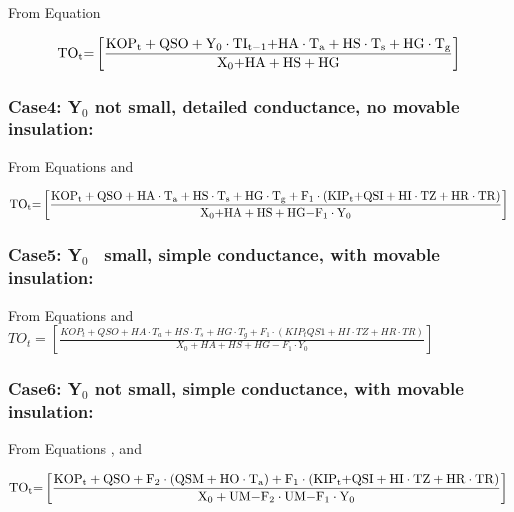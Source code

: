 From Equation

\begin{equation}
{\rm{T}}{{\rm{O}}_{\rm{t}}}{\rm{ = }}\left[ {\frac{{{\rm{KO}}{{\rm{P}}_{\rm{t}}} + {\rm{QSO}} + {{\rm{Y}}_0}\cdot {\rm{T}}{{\rm{I}}_{{\rm{t - 1}}}}{\rm{ + HA}}\cdot {{\rm{T}}_{\rm{a}}} + {\rm{HS}}\cdot {{\rm{T}}_{\rm{s}}} + {\rm{HG}}\cdot {{\rm{T}}_{\rm{g}}}}}{{{{\rm{X}}_{\rm{0}}}{\rm{ + HA + HS + HG}}}}} \right]{\rm{  }}
\end{equation}

\subsubsection{Case4: Y\(_{0}\) not small, detailed conductance, no movable insulation:}\label{case4-yux5f0-not-small-detailed-conductance-no-movable-insulation}

From Equations and

\begin{equation}
{\rm{T}}{{\rm{O}}_{\rm{t}}}{\rm{ = }}\left[ {\frac{{{\rm{KO}}{{\rm{P}}_{\rm{t}}} + {\rm{QSO}} + {\rm{HA}}\cdot {{\rm{T}}_{\rm{a}}} + {\rm{HS}}\cdot {{\rm{T}}_{\rm{s}}} + {\rm{HG}}\cdot {{\rm{T}}_{\rm{g}}} + {{\rm{F}}_{\rm{1}}}\cdot \left( {{\rm{KI}}{{\rm{P}}_{\rm{t}}}{\rm{ + QSI + HI}}\cdot {\rm{TZ + HR}}\cdot {\rm{TR}}} \right)}}{{{{\rm{X}}_{\rm{0}}}{\rm{ + HA + HS + HG - }}{{\rm{F}}_1}\cdot {{\rm{Y}}_0}}}} \right]{\rm{  }}
\end{equation}

\subsubsection{Case5: Y\(_{0}\)~ small, simple conductance, with movable insulation:}\label{case5-yux5f0-small-simple-conductance-with-movable-insulation}

From Equations and \(TO_t = \left[ \frac{ KOP_t + QSO + HA \cdot T_a + HS \cdot T_s + HG \cdot T_g + F_1 \cdot \left( KIP_t QS1 + HI \cdot TZ + HR \cdot TR \right) } { X_0 + HA + HS + HG - F_1 \cdot Y_0 } \right]\)

\subsubsection{Case6: Y\(_{0}\) not small, simple conductance, with movable insulation:}\label{case6-yux5f0-not-small-simple-conductance-with-movable-insulation}

From Equations , and

\begin{equation}
{\rm{T}}{{\rm{O}}_{\rm{t}}}{\rm{ = }}\left[ {\frac{{{\rm{KO}}{{\rm{P}}_{\rm{t}}} + {\rm{QSO}} + {{\rm{F}}_2}\cdot \left( {{\rm{QSM + HO}}\cdot {{\rm{T}}_{\rm{a}}}} \right) + {{\rm{F}}_1}\cdot \left( {{\rm{KI}}{{\rm{P}}_{\rm{t}}}{\rm{ + QSI + HI}}\cdot {\rm{TZ + HR}}\cdot {\rm{TR}}} \right)}}{{{{\rm{X}}_{\rm{0}}} + {\rm{UM - }}{{\rm{F}}_{\rm{2}}}\cdot {\rm{UM - }}{{\rm{F}}_{\rm{1}}}\cdot {{\rm{Y}}_{\rm{0}}}}}} \right]{\rm{  }}
\end{equation}

